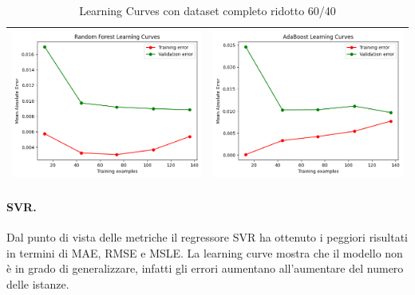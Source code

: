 \begin{table}[H]
\begin{tabularx}{\textwidth}{|X|X|}
        \includegraphics[width=\linewidth, trim=0 0 0 0]{images/RandomForest_lc60_ridotto.png} &
        \includegraphics[width=\linewidth, trim=0 0 0 0]{images/AdaBoost_lc60_ridotto.png} \\
        \hline
    \end{tabularx}
    \caption{Learning Curves con dataset completo ridotto 60/40}
    \label{tab:emissions_info}
\end{table}

\paragraph{\textbf{SVR}.}
Dal punto di vista delle metriche il regressore SVR ha ottenuto i peggiori risultati in termini di MAE, RMSE e MSLE. La learning curve mostra che il modello non è in grado di generalizzare, infatti gli errori aumentano all'aumentare del numero delle istanze.

